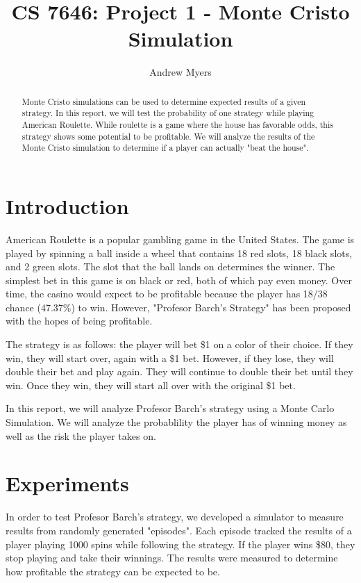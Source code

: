 \documentclass[
	letterpaper, %
]{jdf}
\author{Andrew Myers}
\title{CS 7646: Project 1 - Monte Cristo Simulation}
\begin{document}

\maketitle

\begin{abstract}
Monte Cristo simulations can be used to determine expected results of a given strategy.
In this report, we will test the probability of one strategy while playing American Roulette.
While roulette is a game where the house has favorable odds, this strategy shows some potential to be profitable.
We will analyze the results of the Monte Cristo simulation to determine if a player can actually "beat the house".
\end{abstract}

\section{Introduction}
American Roulette is a popular gambling game in the United States. The game is played by spinning a ball inside a wheel that contains 18
red slots, 18 black slots, and 2 green slots. The slot that the ball lands on determines the winner. The simplest bet in this game is 
on black or red, both of which pay even money. 
Over time, the casino would expect to be profitable because the player has 18/38 chance (47.37\%) to win. 
However, "Profesor Barch's Strategy" has been proposed with the hopes of being profitable.

The strategy is as follows: the player will bet \$1 on a color of their choice. If they win, they will start over, again with a \$1 bet. 
However, if they lose, they will double their bet and play again. They will continue to double their bet until they win. Once they win,
they will start all over with the original \$1 bet.

In this report, we will analyze Profesor Barch's strategy using a Monte Carlo Simulation. We will analyze the probablility the player has of winning
money as well as the risk the player takes on.

\section{Experiments}
In order to test Profesor Barch's strategy, we developed a simulator to measure results from randomly generated "episodes".
Each episode tracked the results of a player playing 1000 spins while following the strategy.
If the player wins \$80, they stop playing and take their winnings.
The results were measured to determine how profitable the strategy can be expected to be.
\end{document}
